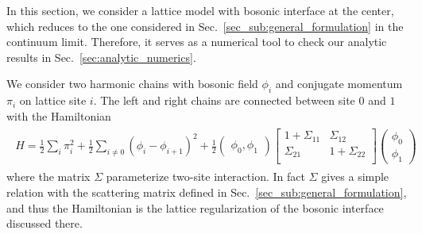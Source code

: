 
In this section, we consider a lattice model with bosonic interface at the center\cite{peschel_exact_2012,calabrese_entanglement_2012}, which reduces to the one considered in Sec.~\ref{sec_sub:general_formulation} in the continuum limit\cite{sakai_entanglement_2008}. Therefore, it serves as a numerical tool to check our analytic results in Sec.~\ref{sec:analytic_numerics}. 



We consider two harmonic chains with bosonic field $\phi_i$ and conjugate momentum $\pi_i$ on lattice site $i$. The left and right chains are connected between site $0$ and $1$ with the Hamiltonian
\begin{eqnarray}\begin{aligned}
H = \frac{1}{2} \sum_i \pi_i^2  +  \frac{1}{2} \sum_{i\ne 0 }  ( \phi_i - \phi_{i+1} )^2  +  \frac{1}{2} \begin{pmatrix}  \phi_0, \phi_1 \end{pmatrix}
\begin{bmatrix}
1 + \Sigma_{11}  & \Sigma_{12} \\
\Sigma_{21} &  1 + \Sigma_{22} \\
\end{bmatrix}
\begin{pmatrix}
\phi_0 \\
\phi_1 
\end{pmatrix}
\end{aligned}\end{eqnarray}
where the matrix $\Sigma$ parameterize two-site interaction. In fact $\Sigma$ gives a simple relation with the scattering matrix defined in Sec.~\ref{sec_sub:general_formulation}, and thus the Hamiltonian is the lattice regularization of the bosonic interface discussed there.


